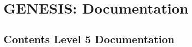 \documentclass[12pt]{article}
\begin{document}
\section*{GENESIS: Documentation}

\subsection*{Contents Level 5 Documentation}

\end{document}

